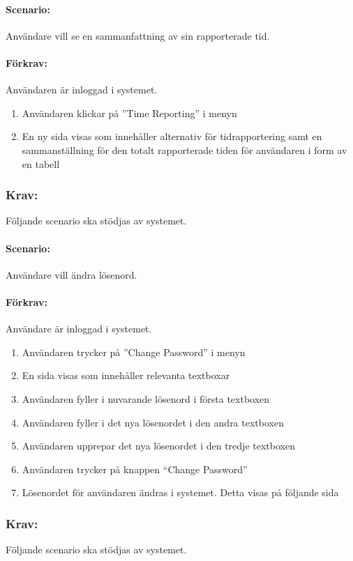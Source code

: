 \documentclass[paper=a4, fontsize=11pt,twoside]{article}
\begin{document}
\paragraph{Scenario:}Användare vill se en sammanfattning av sin rapporterade tid.
\paragraph{Förkrav:}
Användaren är inloggad i systemet.
\begin{enumerate}
\item  Användaren klickar på ”Time Reporting” i menyn
\item  En ny sida visas som innehåller alternativ för tidrapportering samt en sammanställning för den totalt rapporterade tiden för användaren i form av en tabell
\end{enumerate}

\subsubsection{Krav:} Följande scenario ska stödjas av systemet.
\paragraph{Scenario:}Användare vill ändra lösenord.
\paragraph{Förkrav:}
Användare är inloggad i systemet.
\begin{enumerate}
\item	Användaren trycker på ”Change Password” i menyn
\item	En sida visas som innehåller relevanta textboxar
\item	Användaren fyller i nuvarande lösenord i första textboxen
\item	Användaren fyller i det nya lösenordet i den andra textboxen
\item	Användaren upprepar det nya lösenordet i den tredje textboxen
\item	Användaren trycker på knappen “Change Password”
\item	Lösenordet för användaren ändras i systemet. Detta visas på följande sida
\end{enumerate}

\subsubsection{Krav:}Följande scenario ska stödjas av systemet.
\end{document}
